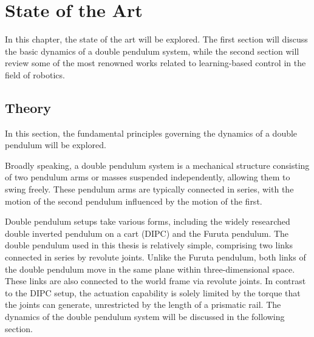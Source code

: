 \chapter{State of the Art}
In this chapter, the state of the art will be explored. The first section will discuss the basic dynamics of a double pendulum system, while the second section will review some of the most renowned works related to learning-based control in the field of robotics.

\section{Theory}
In this section, the fundamental principles governing the dynamics of a double pendulum will be explored.

Broadly speaking, a double pendulum system is a mechanical structure consisting of two pendulum arms or masses suspended independently, allowing them to swing freely. These pendulum arms are typically connected in series, with the motion of the second pendulum influenced by the motion of the first.

Double pendulum setups take various forms, including the widely researched double inverted pendulum on a cart (DIPC)\cite{bogdanov2004optimal} and the Furuta pendulum\cite{cazzolato2011dynamics}\cite{furuta1992swing}. The double pendulum used in this thesis is relatively simple, comprising two links connected in series by revolute joints. Unlike the Furuta pendulum, both links of the double pendulum move in the same plane within three-dimensional space. These links are also connected to the world frame via revolute joints. In contrast to the DIPC setup, the actuation capability is solely limited by the torque that the joints can generate, unrestricted by the length of a prismatic rail. The dynamics of the double pendulum system will be discussed in the following section.

